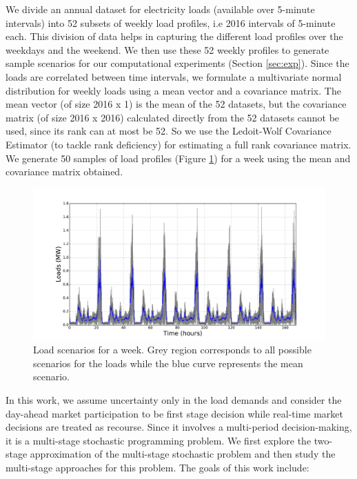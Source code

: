 \documentclass[11pt,twoside]{article}
\begin{document}
We divide an annual dataset for electricity loads (available over 5-minute intervals) into 52 subsets of weekly load profiles, i.e 2016 intervals of 5-minute each. This division of data helps in capturing the different load profiles over the weekdays and the weekend. We then use these 52 weekly profiles to generate sample scenarios for our computational experiments (Section \ref{sec:exp}). Since the loads are correlated between time intervals, we formulate a multivariate normal distribution for weekly loads using a mean vector and a covariance matrix. The mean vector (of size 2016 x 1) is the mean of the 52 datasets, but the covariance matrix (of size 2016 x 2016) calculated directly from the 52 datasets cannot be used, since its rank can at most be 52. So we use the Ledoit-Wolf Covariance Estimator \cite{ledoit2004well} (to tackle rank deficiency) for estimating a full rank covariance matrix. We generate 50 samples of load profiles (Figure \ref{fig:loads_scenarios}) for a week using the mean and covariance matrix obtained. 
\begin{figure}[h!]
\begin{center}
\includegraphics[width=5in]{Figures/Plots/fullproblem_stoch/loads_scenarios.pdf} \caption{Load scenarios for a week. Grey region corresponds to all possible scenarios for the loads while the blue curve represents the mean scenario.}\label{fig:loads_scenarios}\end{center}
\end{figure}
\FloatBarrier
In this work, we assume uncertainty only in the load demands and consider the day-ahead market participation to be first stage decision while real-time market decisions are treated as recourse. Since it involves a multi-period decision-making, it is a multi-stage stochastic programming problem. We first explore the two-stage approximation of the multi-stage stochastic problem and then study the multi-stage approaches for this problem. The goals of this work include:
\end{document}
